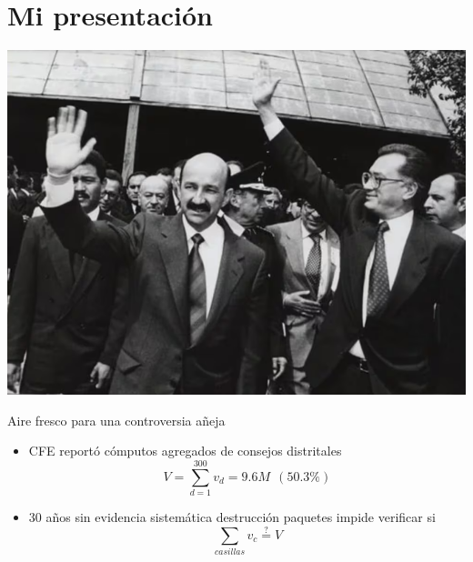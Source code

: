 \documentclass[bigger]{beamer}
\begin{document}
\section{Mi presentación}
\label{sec:org61ab052}
\begin{frame}[label={sec:org4449191}]{}
\includegraphics[width=\textwidth]{./pics/csg-bartlett.png}
\end{frame}
\begin{frame}[label={sec:org797d352}]{Aire fresco para una controversia añeja}
\begin{itemize}
\item CFE reportó cómputos agregados de consejos distritales $$V = \sum_{d=1}^{300} v_d = 9.6M~~(50.3\%)$$
\end{itemize}
\pause
\begin{itemize}
\item 30 años sin evidencia sistemática \newline destrucción paquetes impide verificar si $$\sum_{casillas} v_c \stackrel{\text{?}}{=} V$$
\end{itemize}
\end{frame}
\end{document}
